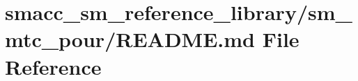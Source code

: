 \hypertarget{smacc__sm__reference__library_2sm__mtc__pour_2README_8md}{}\section{smacc\+\_\+sm\+\_\+reference\+\_\+library/sm\+\_\+mtc\+\_\+pour/\+R\+E\+A\+D\+ME.md File Reference}
\label{smacc__sm__reference__library_2sm__mtc__pour_2README_8md}
